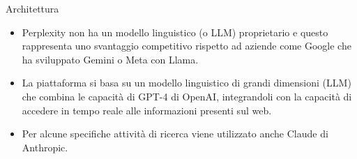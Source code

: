 \documentclass[aspectratio=169]{beamer}
\begin{document}
%
%
\begin{frame}{Architettura}
\begin{itemize}
\item Perplexity non ha un modello linguistico (o LLM) proprietario e questo rappresenta uno svantaggio competitivo rispetto ad aziende come Google che ha sviluppato Gemini o Meta con Llama.
\item La piattaforma si basa su un modello linguistico di grandi dimensioni (LLM) che combina le capacità di GPT-4 di OpenAI, integrandoli con la capacità di accedere in tempo reale alle informazioni presenti sul web. 
\item Per alcune specifiche attività di ricerca viene utilizzato anche Claude di Anthropic.
\end{itemize}
\end{frame}
%
\end{document}
